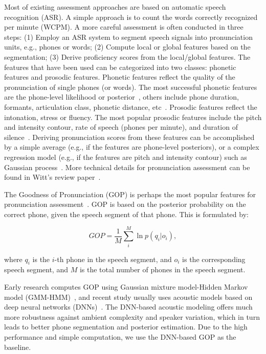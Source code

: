 \documentclass[a4paper]{article}
\begin{document}
Most of existing assessment approaches are based on automatic speech recognition (ASR). A simple approach is to count the
words correctly recognized per minute (WCPM). A more careful assessment is often conducted in three steps:
(1) Employ an ASR system to segment speech signals into pronunciation units, e.g., phones or words; (2) Compute local or
global features based on the segmentation; (3) Derive proficiency scores from the local/global features. The features that have been
used can be categorized into two classes: phonetic features and prosodic features. Phonetic features reflect the
quality of the pronunciation of single phones (or words). The most successful phonetic features are the phone-level likelihood or
posterior~\cite{neumeyer1996automatic,franco1997automatic}, others include phone duration, formants, articulation class,
phonetic distance, etc~\cite{Kyriakopoulos2019,Jenne2019}.
Prosodic features reflect the intonation, stress or fluency. The most popular prosodic features include the pitch and intensity
contour, rate of speech (phones per minute), and duration of silence~\cite{Truong2018,Graham2019}.
Deriving pronunciation scores from these features can be accomplished by a simple average (e.g., if the features are phone-level posteriors),
or a complex regression model (e.g., if the features are pitch and intensity contour) such as Gaussian process~\cite{knill2015automatically}.
More technical details for pronunciation assessment can be found in Witt's review paper~\cite{witt2012automatic}.

The Goodness of Pronunciation (GOP) is perhaps the most popular features for pronunciation assessment~\cite{witt1999use}.
GOP is based on the posterior probability on the correct phone, given the speech segment of that phone. This is formulated by:

\begin{equation}
\label{eq:gop}
GOP = \frac{1}{M} \sum_i^{M} \ln  p(q_i|o_i),
\end{equation}

\noindent where $q_i$ is the $i$-th phone in the speech segment, and $o_i$ is the corresponding speech segment,
and $M$ is the total number of phones in the speech segment.

Early research computes GOP using Gaussian mixture model-Hidden Markov model (GMM-HMM)~\cite{witt1999use}, and recent study
usually uses acoustic models based on deep neural networks (DNNs)~\cite{Sudhakara2019,hu2013new,hu2015improved,huang2017transfer}.
The DNN-based acoustic modeling offers much more robustness against ambient complexity and speaker variation, which in turn leads to better phone
segmentation and posterior estimation. Due to the high performance and simple computation, we use the DNN-based GOP as the baseline.
\end{document}
